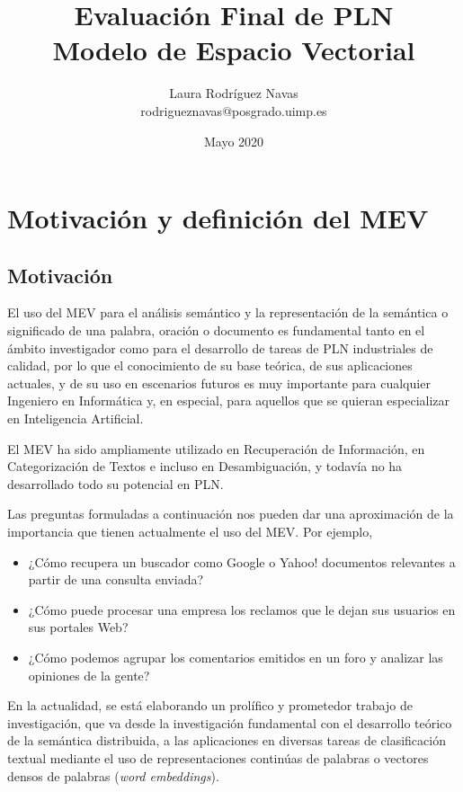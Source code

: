 \documentclass[titlepage]{article}
\title{Evaluación Final de PLN \\ Modelo de Espacio Vectorial}
\author{Laura Rodríguez Navas \\ rodrigueznavas@posgrado.uimp.es}
\date{Mayo 2020}
\begin{document}
\maketitle

\renewcommand{\contentsname}{Índice}
\tableofcontents

\newpage
\section{Motivación y definición del MEV}

\subsection{Motivación}

El uso del MEV para el análisis semántico y la representación de la semántica o significado de una palabra, oración o documento es fundamental tanto en el ámbito investigador como para el desarrollo de tareas de PLN industriales de calidad, por lo que el conocimiento de su base teórica, de sus aplicaciones actuales, y de su uso en escenarios futuros es muy importante para cualquier Ingeniero en Informática y, en especial, para aquellos que se quieran especializar en Inteligencia Artificial.

El MEV ha sido ampliamente utilizado en Recuperación de Información, en Categorización de Textos e incluso en Desambiguación, y todavía no ha desarrollado todo su potencial en PLN. 

Las preguntas formuladas a continuación nos pueden dar una aproximación de la importancia que tienen actualmente el uso del MEV. Por ejemplo,

\begin{itemize}
	\item ¿Cómo recupera un buscador como Google o Yahoo! documentos relevantes a partir de una consulta enviada?
	\item ¿Cómo puede procesar una empresa los reclamos que le dejan sus usuarios en sus portales Web?
	\item 
	¿Cómo podemos agrupar los comentarios emitidos en un foro y analizar las opiniones de la gente?
\end{itemize}

En la actualidad, se está elaborando un prolífico y prometedor trabajo de investigación, que va desde la investigación fundamental con el desarrollo teórico de la semántica distribuida, a las aplicaciones en diversas tareas de clasificación textual mediante el uso de representaciones continúas de palabras o vectores densos de palabras (\textit{word embeddings}). 
\end{document}
